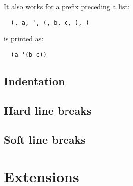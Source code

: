 It also works for a prefix preceding a list:
\begin{verbatim}
  (, a, ', (, b, c, ), )
\end{verbatim}
is printed as:
\begin{verbatim}
  (a '(b c))
\end{verbatim}

\subsection{Indentation}
\subsection{Hard line breaks}
\subsection{Soft line breaks}

\section{Extensions}

